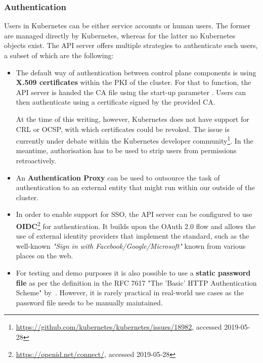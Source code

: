 \subsubsection{Authentication} \label{authentication}


Users in Kubernetes can be either service accounts or human users. The former are managed directly by Kubernetes, whereas for the latter no Kubernetes objects exist. The API server offers multiple strategies to authenticate such users, a subset of which are the following:

\begin{itemize}
    \item The default way of authentication between control plane components is using \textbf{X.509 certificates} within the \ac{PKI} of the cluster. For that to function, the API server is handed the \ac{CA} file using the start-up parameter . Users can then authenticate using a certificate signed by the provided CA. 
    
    At the time of this writing, however, Kubernetes does not have support for \ac{CRL} or \ac{OCSP}, with which certificates could be revoked. The issue is currently under debate within the Kubernetes developer community\footnote{\url{https://github.com/kubernetes/kubernetes/issues/18982}, accessed 2019-05-28}. In the meantime, authorisation has to be used to strip users from permissions retroactively.

    \item An \textbf{Authentication Proxy} can be used to outsource the task of authentication to an external entity that might run within our outside of the cluster.
    
    \item In order to enable support for \ac{SSO}, the API server can be configured to use \textbf{\ac{OIDC}}\footnote{\url{https://openid.net/connect/}, accessed 2019-05-28} for authentication. It builds upon the OAuth 2.0 flow and allows the use of external identity providers that implement the standard, such as the well-known \textit{"Sign in with Facebook/Google/Microsoft"} known from various places on the web. 

   \item For testing and demo purposes it is also possible to use a \textbf{static password file} as per the definition in the RFC 7617 "The 'Basic' HTTP Authentication Scheme" by~\textcite{RFC7617}. However, it is rarely practical in real-world use cases as the password file needs to be manually maintained.
	
\end{itemize}

